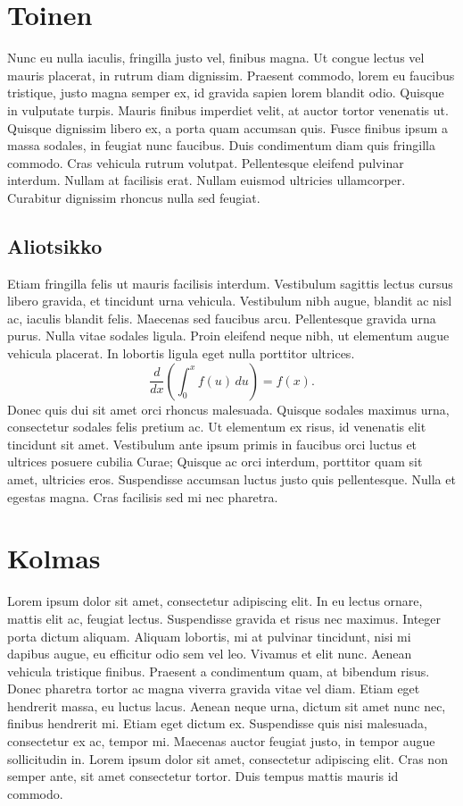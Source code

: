 \documentclass[12pt,a4paper,twoside]{article}
\begin{document}
\newpage

\section{Toinen}

Nunc eu nulla iaculis, fringilla justo vel, finibus magna. Ut congue lectus vel mauris placerat, in rutrum diam dignissim. Praesent commodo, lorem eu faucibus tristique, justo magna semper ex, id gravida sapien lorem blandit odio. Quisque in vulputate turpis. Mauris finibus imperdiet velit, at auctor tortor venenatis ut. Quisque dignissim libero ex, a porta quam accumsan quis. Fusce finibus ipsum a massa sodales, in feugiat nunc faucibus. Duis condimentum diam quis fringilla commodo. Cras vehicula rutrum volutpat. Pellentesque eleifend pulvinar interdum. Nullam at facilisis erat. Nullam euismod ultricies ullamcorper. Curabitur dignissim rhoncus nulla sed feugiat.

\subsection{Aliotsikko}
Etiam fringilla felis ut mauris facilisis interdum. Vestibulum sagittis lectus cursus libero gravida, et tincidunt urna vehicula. Vestibulum nibh augue, blandit ac nisl ac, iaculis blandit felis. Maecenas sed faucibus arcu. Pellentesque gravida urna purus. Nulla vitae sodales ligula. Proin eleifend neque nibh, ut elementum augue vehicula placerat. In lobortis ligula eget nulla porttitor ultrices.
\begin{displaymath}
        \frac{d}{dx}\left( \int_{0}^{x} f(u)\,du\right)=f(x).
\end{displaymath}
Donec quis dui sit amet orci rhoncus malesuada. Quisque sodales maximus urna, consectetur sodales felis pretium ac. Ut elementum ex risus, id venenatis elit tincidunt sit amet. Vestibulum ante ipsum primis in faucibus orci luctus et ultrices posuere cubilia Curae; Quisque ac orci interdum, porttitor quam sit amet, ultricies eros. Suspendisse accumsan luctus justo quis pellentesque. Nulla et egestas magna. Cras facilisis sed mi nec pharetra. 

\section{Kolmas}

Lorem ipsum dolor sit amet, consectetur adipiscing elit. In eu lectus ornare, mattis elit ac, feugiat lectus. Suspendisse gravida et risus nec maximus. Integer porta dictum aliquam. Aliquam lobortis, mi at pulvinar tincidunt, nisi mi dapibus augue, eu efficitur odio sem vel leo. Vivamus et elit nunc. Aenean vehicula tristique finibus. Praesent a condimentum quam, at bibendum risus. Donec pharetra tortor ac magna viverra gravida vitae vel diam. Etiam eget hendrerit massa, eu luctus lacus. Aenean neque urna, dictum sit amet nunc nec, finibus hendrerit mi. Etiam eget dictum ex. Suspendisse quis nisi malesuada, consectetur ex ac, tempor mi. Maecenas auctor feugiat justo, in tempor augue sollicitudin in. Lorem ipsum dolor sit amet, consectetur adipiscing elit. Cras non semper ante, sit amet consectetur tortor. Duis tempus mattis mauris id commodo.
\end{document}
